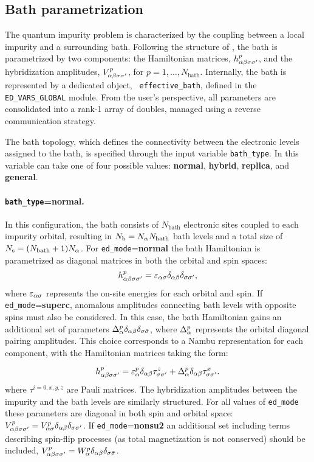 \documentclass[edipack_sp.tex]{subfiles}
\begin{document}
\subsection{Bath parametrization}\label{sSecBath}
The quantum impurity problem is characterized by the coupling between
a local impurity and a surrounding bath. Following the structure of
, the bath is parametrized by two components: the
Hamiltonian matrices, $h_{\alpha\beta\sigma\sigma'}^p$, and the hybridization amplitudes,
$V_{\alpha\beta\sigma\sigma'}^p$, for $p = 1, \dots, N_\mathrm{bath}$.
Internally, the bath is represented by a dedicated object, {\tt
  effective\_bath}, defined in the {\tt ED\_VARS\_GLOBAL} module. From
the user's perspective, all parameters are consolidated into a rank-1
array of doubles, managed using a reverse communication strategy. 


The bath topology, which defines the connectivity between the
electronic levels assigned to the bath, is specified
through the input variable {\tt bath\_type}. 
In \NAME this variable can take one of four possible values: 
{\bf normal}, {\bf hybrid}, {\bf replica}, and {\bf general}.


\paragraph{{\tt bath\_type}={\bf normal}.} In this configuration, the
bath consists of $N_\mathrm{bath}$
electronic sites coupled to each impurity orbital, resulting
in $N_\mathrm{b} = N_\alpha N_\mathrm{bath}$ bath levels and a total size of $N_\mathrm{s}=(N_\mathrm{bath}+1)N_\alpha$.
For {\tt ed\_mode}={\bf normal} the bath Hamiltonian is parametrized as diagonal matrices in both the orbital and spin spaces:
$$
h^p_{\alpha\beta\sigma\sigma'}=\varepsilon_{\alpha\sigma}\delta_{\alpha\beta}\delta_{\sigma\sigma'},
$$
where $\varepsilon_{\alpha\sigma}$ represents  the on-site energies for each orbital and spin. 
%
If {\tt ed\_mode}={\bf superc},  anomalous
amplitudes connecting bath levels with opposite spins must also be
considered. In this case, the bath Hamiltonian gains 
an additional set of parameters $\Delta^p_{\alpha}\delta_{\alpha\beta}\delta_{\sigma \bar{\sigma}}$, where $\Delta^p_\alpha$ represents the orbital diagonal pairing amplitudes. 
This choice corresponds to a Nambu representation for each component, with the Hamiltonian matrices taking the form:

$$
h_{\alpha\beta\sigma\sigma'}^p = \varepsilon_\alpha^p\delta_{\alpha\beta}\tau^z_{\sigma\sigma'} + \Delta^p_\alpha\delta_{\alpha\beta}\tau^x_{\sigma\sigma'} .
$$
where $\tau^{i=0,x,y,z}$ are Pauli matrices.
%
The hybridization amplitudes between the impurity and the bath levels
are similarly structured. For all values of {\tt ed\_mode} these
parameters are diagonal in both
spin and orbital space: $V^p_{\alpha\beta\sigma\sigma'}=V^p_{\alpha\sigma}\delta_{\alpha\beta}\delta_{\sigma\sigma'}$.
%
If {\tt ed\_mode}={\bf nonsu2}  an additional set including terms describing spin-flip processes (as total magnetization is not conserved) should be included, $V^p_{\alpha\beta\sigma\sigma'} =
W^p_{\alpha}\delta_{\alpha\beta}\delta_{\sigma \bar{\sigma}}$. 
%
\end{document}
